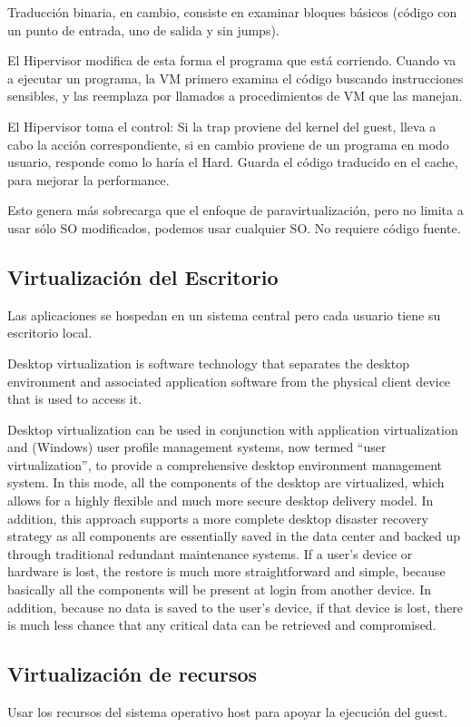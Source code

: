 \documentclass[a4paper, twoside]{article}
\begin{document}
Traducción binaria, en cambio, consiste en examinar bloques básicos (código con un punto de entrada, uno de salida y sin jumps).

El Hipervisor modifica de esta forma el programa que está corriendo. Cuando va a ejecutar un programa, la VM primero examina el código buscando instrucciones sensibles, y las reemplaza por llamados a procedimientos de VM que las manejan.

El Hipervisor toma el control: Si la trap proviene del kernel del guest, lleva a cabo la acción correspondiente, si en cambio proviene de un programa en modo usuario, responde como lo haría el Hard.
Guarda el código traducido en el cache, para mejorar la performance.

Esto genera más sobrecarga que el enfoque de paravirtualización, pero no limita a usar sólo SO modificados, podemos usar cualquier SO. No requiere código fuente.

\subsection{Virtualización del Escritorio}
Las aplicaciones se hospedan en un sistema central pero cada usuario tiene su escritorio local.

Desktop virtualization is software technology that separates the desktop environment and associated application software from the physical client device that is used to access it.

Desktop virtualization can be used in conjunction with application virtualization and (Windows) user profile management systems, now termed ``user virtualization'', to provide a comprehensive desktop environment management system. In this mode, all the components of the desktop are virtualized, which allows for a highly flexible and much more secure desktop delivery model. In addition, this approach supports a more complete desktop disaster recovery strategy as all components are essentially saved in the data center and backed up through traditional redundant maintenance systems. If a user's device or hardware is lost, the restore is much more straightforward and simple, because basically all the components will be present at login from another device. In addition, because no data is saved to the user's device, if that device is lost, there is much less chance that any critical data can be retrieved and compromised. 

\subsection{Virtualización de recursos}
Usar los recursos del sistema operativo host para apoyar la ejecución del guest.
\end{document}

